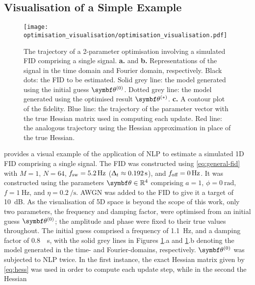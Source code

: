 \subsection{Visualisation of a Simple Example}
\label{subsec:optim-vis}
\begin{figure}
    \centering
    \texttt{[image: optimisation\_visualisation/optimisation\_visualisation.pdf]}
    \caption[
        The trajectory of a 2-parameter optimisation involving a simulated
        \acs{FID}.
    ]
    {
        The trajectory of a 2-parameter optimisation
        involving a simulated \acs{FID} comprising a single signal.
        \textbf{a.} and \textbf{b.} Representations of the signal in
        the time domain and Fourier domain, respectively.
        Black dots: the \ac{FID} to be estimated.
        Solid grey line: the model generated
        using the initial guess $\bthzero$.
        Dotted grey line: the model generated using the optimised result
        $\bthstar$.
        \textbf{c.} A contour plot of the fidelity.
        Blue line: the trajectory of the parameter vector with the true
        Hessian matrix used in computing each update.
        Red line: the analogous trajectory using the Hessian approximation
        in place of the true Hessian.
    }
    \label{fig:optim-vis}
\end{figure}
 provides a visual example of the application of \ac{NLP}
to estimate a simulated \ac{1D} \ac{FID} comprising a single signal.
The FID was constructed using \cref{eq:general-fid} with $M=1$,
$N = 64$, $f_{\mathrm{sw}} = \qty{5.2}{\hertz}$ ($\Updelta_t \approx
\qty{0.192}{\second}$), and $f_{\text{off}} = \qty{0}{\hertz}$.
It was constructed using the parameters $\bth \in \mathbb{R}^4$ comprising $a=1$,
$\phi=\qty{0}{\radian}$, $f=\qty{1}{\hertz}$, and $\eta=\qty{0.2}{\per\second}$.
\ac{AWGN}\label{corr:awgn}
was added to the \ac{FID} to give it a target  of
\qty{10}{\deci\bel}. As the visualisation of 5D space is beyond the scope of
this work, only two parameters, the frequency and damping factor, were optimised
from an initial guess $\bthzero$; the amplitude and phase were fixed to
their true values throughout. The initial guess comprised a frequency of
\qty{1.1}{\hertz}, and a damping factor of \qty{0.8}{\per\second}, with the
solid grey lines in Figures \ref{fig:optim-vis}.a and \ref{fig:optim-vis}.b
denoting the model generated in the time- and
Fourier-domains, respectively. $\bthzero$ was subjected to \ac{NLP} twice. In
the first instance, the exact Hessian matrix given by \cref{eq:hess} was used
in order to compute each update step, while in the second the Hessian
